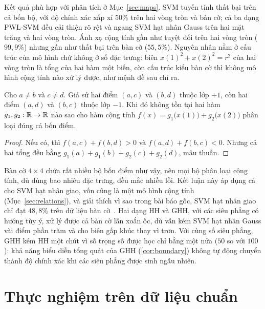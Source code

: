 Kết quả phù hợp với phân tích ở Mục~\ref{sec:maps}. SVM tuyến tính thất bại trên cả bốn bộ, với độ chính xác xấp xỉ $50\%$ trên hai vòng tròn và bàn cờ; cả ba dạng PWL-SVM đều cải thiện rõ rệt và ngang SVM hạt nhân Gauss trên hai mặt trăng và hai vòng tròn. Ánh xạ cộng tính gần như tuyệt đối trên hai vòng tròn ($99{,}9\%$) nhưng gần như thất bại trên bàn cờ ($55{,}5\%$). Nguyên nhân nằm ở cấu trúc của mô hình chứ không ở số đặc trưng: biên $x(1)^2+x(2)^2=r^2$ của hai vòng tròn là tổng của hai hàm một biến, còn cấu trúc kiểu bàn cờ thì không mô hình cộng tính nào xử lý được, như mệnh đề sau chỉ ra.

\begin{proposition}\label{prop:xor}
Cho $a\neq b$ và $c\neq d$. Giả sử hai điểm $(a,c)$ và $(b,d)$ thuộc lớp $+1$, còn hai điểm $(a,d)$ và $(b,c)$ thuộc lớp $-1$. Khi đó không tồn tại hai hàm $g_1,g_2:\mathbb{R}\to\mathbb{R}$ nào sao cho hàm cộng tính $f(x)=g_1\bigl(x(1)\bigr)+g_2\bigl(x(2)\bigr)$ phân loại đúng cả bốn điểm.
\end{proposition}

\begin{proof}
Nếu có, thì $f(a,c)+f(b,d)>0$ và $f(a,d)+f(b,c)<0$. Nhưng cả hai tổng đều bằng $g_1(a)+g_1(b)+g_2(c)+g_2(d)$, mâu thuẫn.
\end{proof}

Bàn cờ $4\times4$ chứa rất nhiều bộ bốn điểm như vậy, nên mọi bộ phân loại cộng tính, dù dùng bao nhiêu đặc trưng, đều mắc nhiều lỗi. Kết luận này áp dụng cả cho SVM hạt nhân giao, vốn cũng là một mô hình cộng tính (Mục~\ref{sec:relations}), và giải thích vì sao trong bài báo gốc, SVM hạt nhân giao chỉ đạt $48{,}8\%$ trên dữ liệu bàn cờ~\cite[Bảng~1]{huang2013}. Hai dạng HH và GHH, với các siêu phẳng có hướng tùy ý, xử lý được cả bàn cờ lẫn xoắn ốc, dù vẫn kém SVM hạt nhân Gauss vài điểm phần trăm và cho biên gấp khúc thay vì trơn. Với cùng số siêu phẳng, GHH kém HH một chút vì số trọng số được học chỉ bằng một nửa ($50$ so với $100$): khả năng biểu diễn tổng quát của GHH (\cref{cor:boundary}) không tự động chuyển thành độ chính xác khi các siêu phẳng được sinh ngẫu nhiên.

\section{Thực nghiệm trên dữ liệu chuẩn}\label{sec:benchmark}




